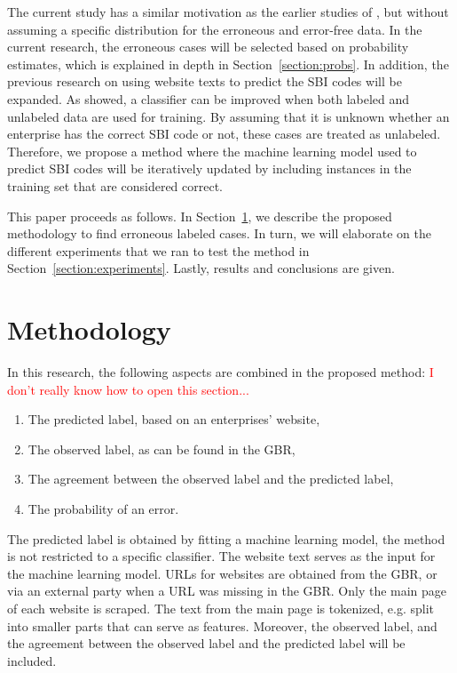 \documentclass[12pt, a4paper, titlepage]{article}
\begin{document}
The current study has a similar motivation as the earlier studies of \citet{DiZio, Eskin}, but without assuming a specific distribution for the erroneous and error-free data. In the current research, the erroneous cases will be selected based on probability estimates, which is explained in depth in Section~\ref{section:probs}. In addition, the previous research on using website texts to predict the SBI codes will be expanded. As \citet{Nigam} showed, a classifier can be improved when both labeled and unlabeled data are used for training. By assuming that it is unknown whether an enterprise has the correct SBI code or not, these cases are treated as unlabeled. Therefore, we propose a method where the machine learning model used to predict SBI codes will be iteratively updated by including instances in the training set that are considered correct. 

\bigskip

This paper proceeds as follows. In Section~\ref{section:method}, we describe the proposed methodology to find erroneous labeled cases. In turn, we will elaborate on the different experiments that we ran to test the method in Section~\ref{section:experiments}. Lastly, results and conclusions are given.




							\section{Methodology}
							\label{section:method}

In this research, the following aspects are combined in the proposed method:
\textcolor{red}{I don't really know how to open this section...}


\begin{enumerate}
\item The predicted label, based on an enterprises' website,
\item The observed label, as can be found in the GBR,
\item The agreement between the observed label and the predicted label,
\item The probability of an error.
\end{enumerate}

The predicted label is obtained by fitting a machine learning model, the method is not restricted to a specific classifier.  The website text serves as the input for the machine learning model. URLs for websites are obtained from the GBR, or via an external party when a URL was missing in the GBR. Only the main page of each website is scraped. The text from the main page is tokenized, e.g. split into smaller parts that can serve as features. Moreover, the observed label, and the agreement between the observed label and the predicted label will be included. 
\end{document}
